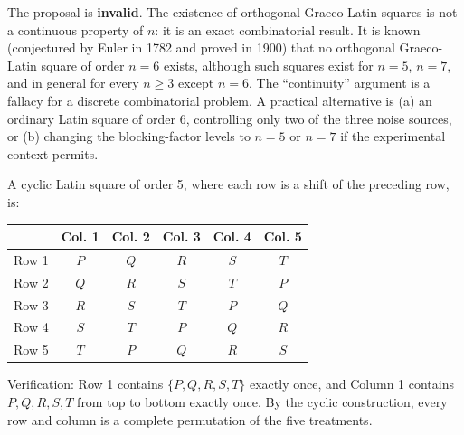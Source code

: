 \begin{solproblema}
The proposal is \textbf{invalid}. The existence of orthogonal Graeco-Latin squares is not a continuous property of $n$: it is an exact combinatorial result. It is known (conjectured by Euler in 1782 and proved in 1900) that no orthogonal Graeco-Latin square of order $n=6$ exists, although such squares exist for $n=5$, $n=7$, and in general for every $n\ge3$ except $n=6$. The ``continuity'' argument is a fallacy for a discrete combinatorial problem. A practical alternative is (a) an ordinary Latin square of order 6, controlling only two of the three noise sources, or (b) changing the blocking-factor levels to $n=5$ or $n=7$ if the experimental context permits.
\end{solproblema}

\begin{solproblema}[prob:c1de238]
A cyclic Latin square of order 5, where each row is a shift of the preceding row, is:
\begin{center}
\begin{tabular}{c|ccccc}
 & Col. 1 & Col. 2 & Col. 3 & Col. 4 & Col. 5 \\ \hline
Row 1 & $P$ & $Q$ & $R$ & $S$ & $T$ \\
Row 2 & $Q$ & $R$ & $S$ & $T$ & $P$ \\
Row 3 & $R$ & $S$ & $T$ & $P$ & $Q$ \\
Row 4 & $S$ & $T$ & $P$ & $Q$ & $R$ \\
Row 5 & $T$ & $P$ & $Q$ & $R$ & $S$ \\
\end{tabular}
\end{center}
Verification: Row 1 contains $\{P,Q,R,S,T\}$ exactly once, and Column 1 contains $P,Q,R,S,T$ from top to bottom exactly once. By the cyclic construction, every row and column is a complete permutation of the five treatments.
\end{solproblema}
